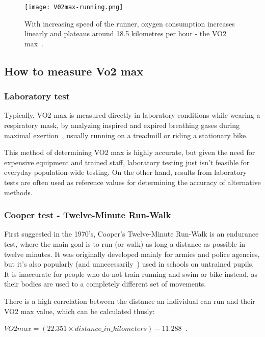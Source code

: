 \begin{figure}[h]
    \texttt{[image: V02max-running.png]}
    \caption{With increasing speed of the runner, oxygen consumption increases linearly and plateaus around 18.5 kilometres per hour - the VO2 max~\cite{vo2max-speed-img}.}
\end{figure}

\subsection*{How to measure Vo2 max}

\subsubsection*{Laboratory test}

Typically, VO2 max is measured directly in laboratory conditions while wearing a respiratory mask, by analyzing inspired and expired breathing gases during maximal exertion~\cite{vo2max-definition}, usually running on a treadmill or riding a stationary bike.

This method of determining VO2 max is highly accurate, but given the need for expensive equipment and trained staff, laboratory testing just isn't feasible for everyday population-wide testing.
On the other hand, results from laboratory tests are often used as reference values for determining the accuracy of alternative methods.

\subsubsection*{Cooper test - Twelve-Minute Run-Walk}

First suggested in the 1970's, Cooper's Twelve-Minute Run-Walk is an endurance test, where the main goal is to run (or walk) as long a distance as possible in twelve minutes.
It was originally developed mainly for armies and police agencies, but it's also popularly (and unnecessarily~\cite{cooper-pupils}) used in schools on untrained pupils.
It is inaccurate for people who do not train running and swim or bike instead, as their bodies are used to a completely different set of movements.

There is a high correlation between the distance an individual can run and their VO2 max value, which can be calculated thusly:

$VO2max = (22.351 \times distance\_in\_kilometers) - 11.288$~\cite{cooper-vo2max}.

